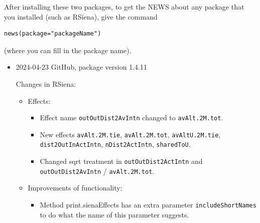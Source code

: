 \documentclass[a4paper,fleqn,11pt]{article}
\newcommand{\+}{\, + \,}
\newcommand{\sfn}[1]{\textsf{#1}}
\newcommand{\rs}{{\sf RSiena}}
\begin{document}
After installing these two packages,
to get the NEWS about any package that you installed
(such  as \rs), give the command
\begin{verbatim}
news(package="packageName")
\end{verbatim}
(where you can fill in the package name).
\bigskip

\begin{small}
\begin{itemize} %

\item 2024-04-23 GitHub, package version 1.4.11

Changes in RSiena:
\begin{itemize}
\item Effects:
   \begin{itemize}
  \item Effect name \texttt{outOutDist2AvIntn} changed to \texttt{avAlt.2M.tot}.
  \item New effects \texttt{avAlt.2M.tie}, \texttt{avAlt.2M.tot}, \texttt{avAltU.2M.tie},
    \texttt{dist2OutInActIntn}, \texttt{nDist2ActIntn}, \texttt{sharedToU}.
  \item Changed sqrt treatment in \texttt{outOutDist2ActIntn} and
    \texttt{outOutDist2AvIntn} / \texttt{avAlt.2M.tot}.
  \end{itemize}
\item Improvements of functionality:
   \begin{itemize}
  \item Method \sfn{print.sienaEffects} has an extra parameter \texttt{includeShortNames}
    to do what the name of this parameter suggests.
    \end{itemize}  
\end{itemize}



\end{itemize}
\end{small}
\end{document}
